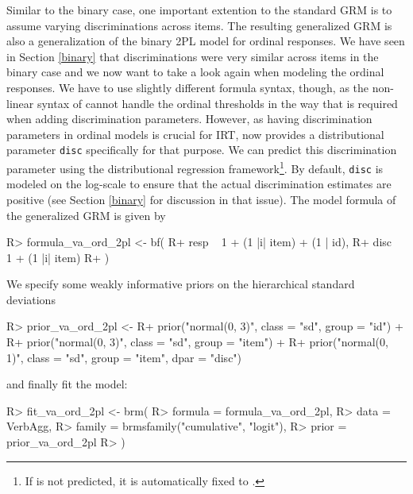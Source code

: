 \documentclass[jss]{jss}
\begin{document}
Similar to the binary case, one important extention to the standard GRM
is to assume varying discriminations across items. The resulting
generalized GRM is also a generalization of the binary 2PL model for
ordinal responses. We have seen in Section \ref{binary} that
discriminations were very similar across items in the binary case and we
now want to take a look again when modeling the ordinal responses. We
have to use slightly different formula syntax, though, as the non-linear
syntax of  cannot handle the ordinal thresholds in the way
that is required when adding discrimination parameters. However, as
having discrimination parameters in ordinal models is crucial for IRT,
 now provides a distributional parameter \texttt{disc}
specifically for that purpose. We can predict this discrimination
parameter using the distributional regression
framework\footnote{If  is not predicted, it is automatically fixed to
.}. By default, \texttt{disc} is modeled on the log-scale to
ensure that the actual discrimination estimates are positive (see
Section \ref{binary} for discussion in that issue). The model formula of
the generalized GRM is given by

\begin{CodeChunk}

\begin{CodeInput}
R> formula_va_ord_2pl <- bf(
R+   resp ~ 1 + (1 |i| item) + (1 | id),
R+   disc ~ 1 + (1 |i| item)    
R+ )
\end{CodeInput}
\end{CodeChunk}

We specify some weakly informative priors on the hierarchical standard
deviations

\begin{CodeChunk}

\begin{CodeInput}
R> prior_va_ord_2pl <- 
R+   prior("normal(0, 3)", class = "sd", group = "id") + 
R+   prior("normal(0, 3)", class = "sd", group = "item") +
R+   prior("normal(0, 1)", class = "sd", group = "item", dpar = "disc")
\end{CodeInput}
\end{CodeChunk}

and finally fit the model:

\begin{CodeChunk}

\begin{CodeInput}
R> fit_va_ord_2pl <- brm(
R>   formula = formula_va_ord_2pl,
R>   data = VerbAgg,
R>   family = brmsfamily("cumulative", "logit"),
R>   prior = prior_va_ord_2pl
R> )
\end{CodeInput}
\end{CodeChunk}
\end{document}
